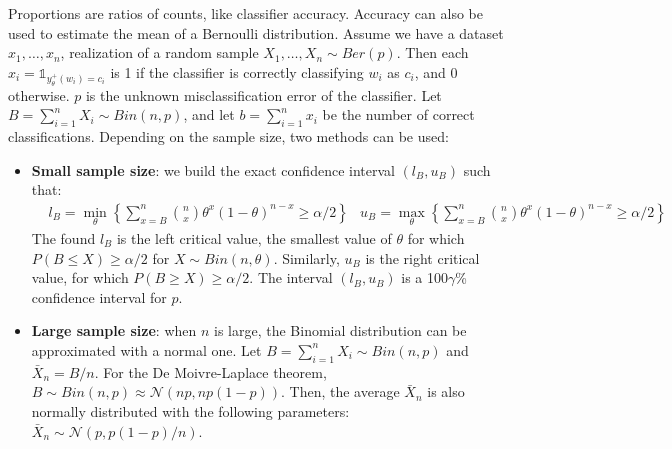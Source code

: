 Proportions are ratios of counts, like classifier accuracy. Accuracy can also be used to estimate the mean of a Bernoulli distribution. Assume we have a dataset $x_1, \ldots, x_n$, realization of a random sample $X_1, \ldots, X_n \sim Ber(p)$. Then each $x_i = \mathds{1}_{y_{\theta}^+(w_i)=c_i}$ is 1 if the classifier is correctly classifying $w_i$ as $c_i$, and 0 otherwise. $p$ is the unknown misclassification error of the classifier. Let $B = \sum_{i=1}^n X_i \sim Bin(n,p)$, and let $b = \sum_{i=1}^n x_i$ be the number of correct classifications. Depending on the sample size, two methods can be used:
\begin{itemize}
    \item \textbf{Small sample size}: we build the exact confidence interval $(l_B, u_B)$ such that:
    \begin{align*}
        &l_B = \min_{\theta} \left\{ \sum_{x=B}^n \binom{n}{x} \theta^x (1-\theta)^{n-x} \geq \alpha/2 \right\} &u_B = \max_{\theta} \left\{ \sum_{x=B}^n \binom{n}{x} \theta^x (1-\theta)^{n-x} \geq \alpha/2 \right\}
    \end{align*}
    The found $l_B$ is the left critical value, the smallest value of $\theta$ for which $P(B \leq X) \geq \alpha/2$ for $X \sim Bin(n, \theta)$. Similarly, $u_B$ is the right critical value, for which $P(B \geq X) \geq \alpha/2$. The interval $(l_B, u_B)$ is a 100$\gamma$\% confidence interval for $p$.

    \item \textbf{Large sample size}: when $n$ is large, the Binomial distribution can be approximated with a normal one. Let $B = \sum_{i=1}^n X_i \sim Bin(n,p)$ and $\bar{X}_n = B/n$. For the De Moivre-Laplace theorem, $B \sim Bin(n,p) \approx \mathcal{N}(np, np(1-p))$. Then, the average $\bar{X}_n$ is also normally distributed with the following parameters: $\bar{X}_n \sim \mathcal{N}(p, p(1-p)/n)$.
    

\end{itemize}
